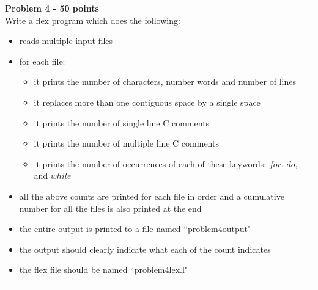 \documentclass[a4paper, 11pt]{article}
\newenvironment{problem}[2][Problem]
    { \begin{mdframed}[backgroundcolor=gray!20] \textbf{#1 #2} \\}
    {  \end{mdframed}}
\begin{document}
\begin{problem}{4 - 50 points}
Write a flex program which does the following:
\begin{itemize}
    \item reads multiple input files
    \item for each file:
          \begin{itemize}
              \item it prints the number of characters, number words and number of lines
              \item it replaces more than one contiguous space by a single space
              \item it prints the number of single line C comments
              \item it prints the number of multiple line C comments
              \item it prints the number of occurrences of each of these keywords: $for$, $do$, and $while$
          \end{itemize}
    \item all the above counts are printed for each file in order and a cumulative number for all the files is also printed at the end
    \item the entire output is printed to a file named ``problem4output"
    \item the output should clearly indicate what each of the count indicates
    \item the flex file should be named ``problem4lex.l"
\end{itemize}
\end{problem}

\noindent\rule{7in}{2.8pt}
\end{document}
